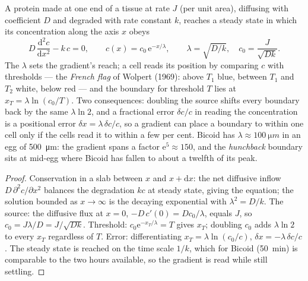 \begin{theorem}\label{thm:b3:developmental-genetics:gradient}
A protein made at one end of a tissue at rate $J$ (per unit area),
diffusing with coefficient $D$ and degraded with rate constant $k$,
reaches a steady state in which its concentration along the axis $x$
obeys
\[
D\,\frac{\mathrm{d}^{2}c}{\mathrm{d}x^{2}} - k\,c = 0,
\qquad c(x) = c_{0}\,\mathrm{e}^{-x/\lambda}, \qquad \lambda = \sqrt{D/k},
\quad c_{0} = \frac{J}{\sqrt{Dk}} .
\]
The \emph{} $\lambda$ sets the gradient's reach; a cell
reads its position by comparing $c$ with thresholds --- the
\emph{French flag} of Wolpert (1969): above $T_{1}$ blue, between
$T_{1}$ and $T_{2}$ white, below red --- and the boundary for threshold
$T$ lies at $x_{T} = \lambda\ln(c_{0}/T)$. Two consequences: doubling
the source shifts every boundary back by the same $\lambda\ln 2$, and a
fractional error $\delta c/c$ in reading the concentration is a
positional error $\delta x = \lambda\,\delta c/c$, so a gradient can
place a boundary to within one cell only if the cells read it to within
a few per cent. Bicoid has $\lambda \approx \qty{100}{\micro m}$ in an
egg of \qty{500}{\micro m}: the gradient spans a factor $\mathrm{e}^{5}
\approx 150$, and the \emph{hunchback} boundary sits at mid-egg where
Bicoid has fallen to about a twelfth of its peak.
\end{theorem}
\begin{proof}
Conservation in a slab between $x$ and $x + \mathrm{d}x$: the net
diffusive inflow $D\,\partial^{2}c/\partial x^{2}$ balances the
degradation $kc$ at steady state, giving the equation; the solution
bounded as $x \to \infty$ is the decaying exponential with
$\lambda^{2} = D/k$. The source: the diffusive flux at $x = 0$, $-D\,
c'(0) = Dc_{0}/\lambda$, equals $J$, so $c_{0} = J\lambda/D =
J/\sqrt{Dk}$. Threshold: $c_{0}\mathrm{e}^{-x_{T}/\lambda} = T$ gives
$x_{T}$; doubling $c_{0}$ adds $\lambda\ln 2$ to every $x_{T}$
regardless of $T$. Error: differentiating $x_{T} = \lambda\ln(c_{0}/c)$,
$\delta x = -\lambda\,\delta c/c$. The steady state is reached on the
time scale $1/k$, which for Bicoid (\qty{50}{min}) is comparable to the
two hours available, so the gradient is read while still settling.
\end{proof}

